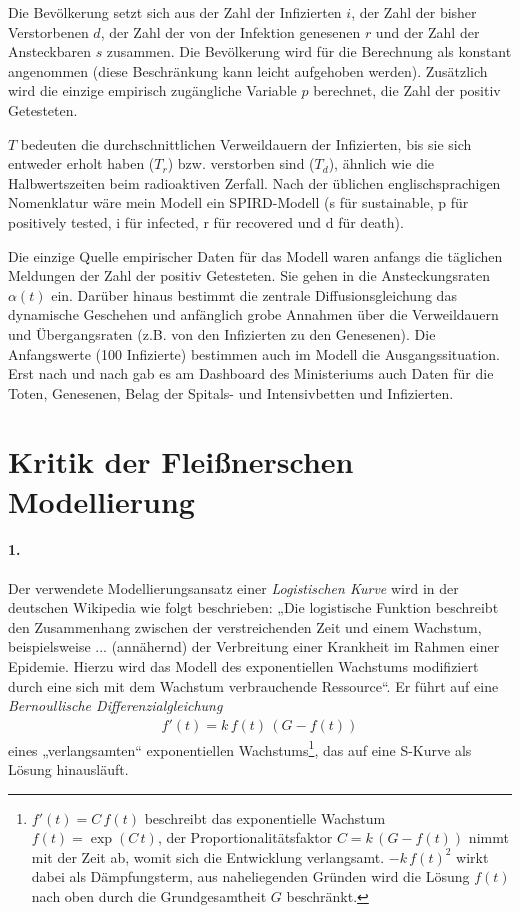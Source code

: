 \documentclass[a4paper,11pt]{article}
\begin{document}
Die Bevölkerung setzt sich aus der Zahl der Infizierten $i$, der Zahl der
bisher Verstorbenen $d$, der Zahl der von der Infektion genesenen $r$ und der
Zahl der Ansteckbaren $s$ zusammen. Die Bevölkerung wird für die Berechnung
als konstant angenommen (diese Beschränkung kann leicht aufgehoben werden).
Zusätzlich wird die einzige empirisch zugängliche Variable $p$ berechnet, die
Zahl der positiv Getesteten.

$T$ bedeuten die durchschnittlichen Verweildauern der Infizierten, bis sie
sich entweder erholt haben ($T_r$) bzw. verstorben sind ($T_d$), ähnlich wie
die Halbwertszeiten beim radioaktiven Zerfall. Nach der üblichen
englischsprachigen Nomenklatur wäre mein Modell ein SPIRD-Modell (s für
sustainable, p für positively tested, i für infected, r für recovered und d
für death).

Die einzige Quelle empirischer Daten für das Modell waren anfangs die
täglichen Meldungen der Zahl der positiv Getesteten. Sie gehen in die
Ansteckungsraten $\alpha(t)$ ein. Darüber hinaus bestimmt die zentrale
Diffusionsgleichung das dynamische Geschehen und anfänglich grobe Annahmen
über die Verweildauern und Übergangsraten (z.B. von den Infizierten zu den
Genesenen). Die Anfangswerte (100 Infizierte) bestimmen auch im Modell die
Ausgangssituation. Erst nach und nach gab es am Dashboard des Ministeriums
auch Daten für die Toten, Genesenen, Belag der Spitals- und Intensivbetten und
Infizierten.

\section{Kritik der Fleißnerschen Modellierung}

\paragraph{1.}
Der verwendete Modellierungsansatz einer \emph{Logistischen Kurve} wird in der
deutschen Wikipedia wie folgt beschrieben: „Die logistische Funktion
beschreibt den Zusammenhang zwischen der verstreichenden Zeit und einem
Wachstum, beispielsweise ... (annähernd) der Verbreitung einer Krankheit im
Rahmen einer Epidemie. Hierzu wird das Modell des exponentiellen Wachstums
modifiziert durch eine sich mit dem Wachstum verbrauchende Ressource“.  Er
führt auf eine \emph{Bernoullische Differenzialgleichung}
\begin{gather*}
  f'(t)=k\,f(t)\,(G-f(t))
\end{gather*}
eines „verlangsamten“ exponentiellen Wachstums\footnote{$f'(t)=C\,f(t)$
  beschreibt das exponentielle Wachstum $f(t)=\exp(C\,t)$, der
  Proportionalitätsfaktor $C=k\,(G-f(t))$ nimmt mit der Zeit ab, womit sich
  die Entwicklung verlangsamt. $-k\,f(t)^2$ wirkt dabei als Dämpfungsterm, aus
  naheliegenden Gründen wird die Lösung $f(t)$ nach oben durch die
  Grundgesamtheit $G$ beschränkt.}, das auf eine S-Kurve als Lösung
hinausläuft.
\end{document}
